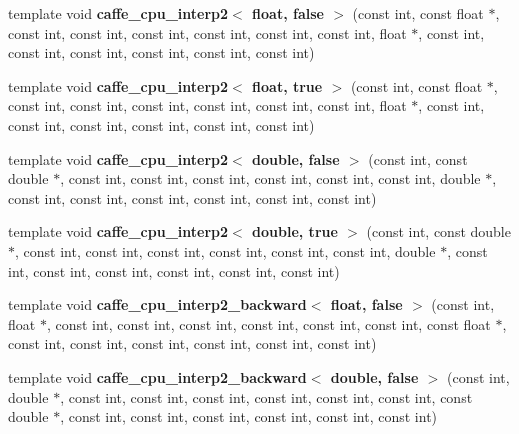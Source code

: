\begin{DoxyCompactItemize}
\item 
template void {\bfseries caffe\+\_\+cpu\+\_\+interp2$<$ float, false $>$} (const int, const float $\ast$, const int, const int, const int, const int, const int, const int, float $\ast$, const int, const int, const int, const int, const int, const int)\hypertarget{namespacecaffe_a8a9b4047e43555ac4b71630acade4d6d}{}\label{namespacecaffe_a8a9b4047e43555ac4b71630acade4d6d}

\item 
template void {\bfseries caffe\+\_\+cpu\+\_\+interp2$<$ float, true $>$} (const int, const float $\ast$, const int, const int, const int, const int, const int, const int, float $\ast$, const int, const int, const int, const int, const int, const int)\hypertarget{namespacecaffe_a8c298f77d763fc2d8effe98fe4277276}{}\label{namespacecaffe_a8c298f77d763fc2d8effe98fe4277276}

\item 
template void {\bfseries caffe\+\_\+cpu\+\_\+interp2$<$ double, false $>$} (const int, const double $\ast$, const int, const int, const int, const int, const int, const int, double $\ast$, const int, const int, const int, const int, const int, const int)\hypertarget{namespacecaffe_a33b27f34f5d3d4f847d77e64ef16c533}{}\label{namespacecaffe_a33b27f34f5d3d4f847d77e64ef16c533}

\item 
template void {\bfseries caffe\+\_\+cpu\+\_\+interp2$<$ double, true $>$} (const int, const double $\ast$, const int, const int, const int, const int, const int, const int, double $\ast$, const int, const int, const int, const int, const int, const int)\hypertarget{namespacecaffe_a806b49f696a1e9a67e348be31d158359}{}\label{namespacecaffe_a806b49f696a1e9a67e348be31d158359}

\item 
template void {\bfseries caffe\+\_\+cpu\+\_\+interp2\+\_\+backward$<$ float, false $>$} (const int, float $\ast$, const int, const int, const int, const int, const int, const int, const float $\ast$, const int, const int, const int, const int, const int, const int)\hypertarget{namespacecaffe_ab8c82496638e6b4c60865cc848bd44c4}{}\label{namespacecaffe_ab8c82496638e6b4c60865cc848bd44c4}

\item 
template void {\bfseries caffe\+\_\+cpu\+\_\+interp2\+\_\+backward$<$ double, false $>$} (const int, double $\ast$, const int, const int, const int, const int, const int, const int, const double $\ast$, const int, const int, const int, const int, const int, const int)\hypertarget{namespacecaffe_a3a93217884ae59d39a7a8efaa82ad91e}{}\label{namespacecaffe_a3a93217884ae59d39a7a8efaa82ad91e}


\end{DoxyCompactItemize}
